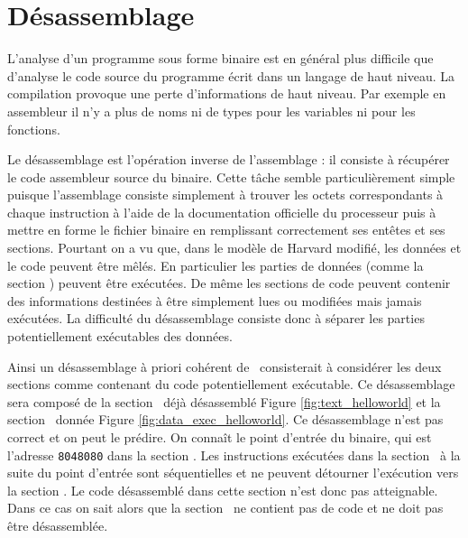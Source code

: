 

\section{Désassemblage}
L'analyse d'un programme sous forme binaire est en général plus difficile que d'analyse le code source du programme écrit dans un langage de haut niveau.
La compilation provoque une perte d'informations de haut niveau.
Par exemple en assembleur il n'y a plus de noms ni de types pour les variables ni pour les fonctions. 

Le désassemblage est l'opération inverse de l'assemblage : il consiste à récupérer le code assembleur source du binaire.
Cette tâche semble particulièrement simple puisque l'assemblage consiste simplement à trouver les octets correspondants à chaque instruction à l'aide de la documentation officielle du processeur puis à mettre en forme le fichier binaire en remplissant correctement ses entêtes et ses sections.
Pourtant on a vu que, dans le modèle de Harvard modifié, les données et le code peuvent être mêlés. 
En particulier les parties de données (comme la section \pdata) peuvent être exécutées. 
De même les sections de code peuvent contenir des informations destinées à être simplement lues ou modifiées mais jamais exécutées.
La difficulté du désassemblage consiste donc à séparer les parties potentiellement exécutables des données.

Ainsi un désassemblage à priori cohérent de \helloworld\ consisterait à considérer les deux sections comme contenant du code potentiellement exécutable. Ce désassemblage sera composé de la section \ptext\ déjà désassemblé Figure \ref{fig:text_helloworld} et la section \pdata\ donnée Figure \ref{fig:data_exec_helloworld}.
Ce désassemblage n'est pas correct et on peut le prédire. 
On connaît le point d'entrée du binaire, qui est l'adresse \texttt{8048080} dans la section \ptext.
Les instructions exécutées dans la section \ptext\ à la suite du point d'entrée sont séquentielles et ne peuvent détourner l'exécution vers la section \pdata. 
Le code désassemblé dans cette section n'est donc pas atteignable. Dans ce cas on sait alors que la section \pdata\ ne contient pas de code et ne doit pas être désassemblée.

